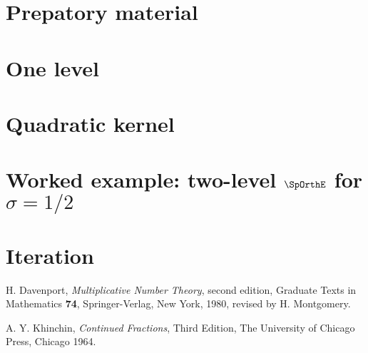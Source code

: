 \documentclass[11pt, reqno]{article}
\theoremstyle{definition}
\theoremstyle{remark}
\begin{document}
\section{Prepatory material}


\section{One level}


\section{Quadratic kernel}


\section{Worked example: two-level $\SpOrthE$ for $\sigma = 1/2$}


\section{Iteration}


\begin{thebibliography}{9999}


\newblock H. Davenport, \emph{Multiplicative Number Theory}, second
edition, Graduate Texts in Mathematics \textbf{74},
Springer-Verlag, New York, 1980, revised by H. Montgomery.

\newblock A. Y. Khinchin, \emph{Continued Fractions},  Third
Edition, The University of Chicago Press, Chicago 1964.


\end{thebibliography}
\end{document}
